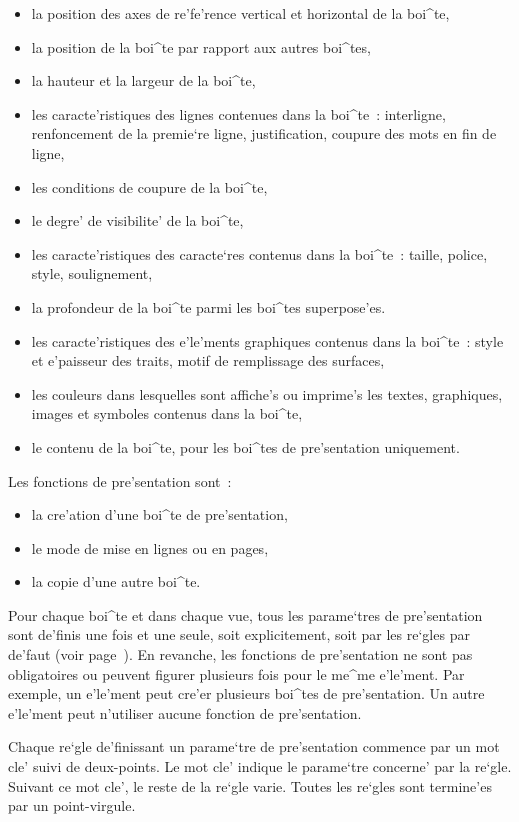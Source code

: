 {\begin{itemize}
\item la position des axes de re'fe'rence vertical et horizontal de la boi^te,
\item la position de la boi^te par rapport aux autres boi^tes,
\item la hauteur et la largeur de la boi^te,
\item les caracte'ristiques des lignes contenues dans la boi^te~: interligne,
    renfoncement de la premie`re ligne, justification, coupure des mots en fin
    de ligne,
\item les conditions de coupure de la boi^te,
\item le degre' de visibilite' de la boi^te,
\item les caracte'ristiques des caracte`res contenus dans la boi^te~: taille,
    police, style, soulignement,
\item la profondeur de la boi^te parmi les boi^tes superpose'es.
\item les caracte'ristiques des e'le'ments graphiques contenus dans la boi^te~:
    style et e'paisseur des traits, motif de remplissage des surfaces,
\item les couleurs dans lesquelles sont affiche's ou imprime's les textes,
    graphiques, images et symboles contenus dans la boi^te,
\item le contenu de la boi^te, pour les boi^tes de pre'sentation uniquement.
\end{itemize}
Les fonctions de pre'sentation sont~:
\label{fonctpres}

\begin{itemize}
\item la cre'ation d'une boi^te de pre'sentation,
\item le mode de mise en lignes ou en pages,
\item la copie d'une autre boi^te.
\end{itemize}

Pour chaque boi^te et dans chaque vue, tous les parame`tres de pre'sentation
sont de'finis une fois et une seule, soit explicitement, soit par les re`gles
par de'faut (voir page~\pageref{reglesdefaut}). En revanche, les fonctions
de pre'sentation ne sont pas
obligatoires ou peuvent figurer plusieurs fois pour le me^me e'le'ment.
Par exemple, un e'le'ment peut cre'er plusieurs boi^tes de pre'sentation.
Un autre e'le'ment peut n'utiliser aucune fonction de pre'sentation.

Chaque re`gle de'finissant un parame`tre de pre'sentation commence par un
mot cle' suivi de deux-points. Le mot cle' indique le parame`tre concerne' par
la re`gle. Suivant ce mot cle', le reste de la re`gle varie. Toutes
les re`gles sont termine'es par un point-virgule.

}
